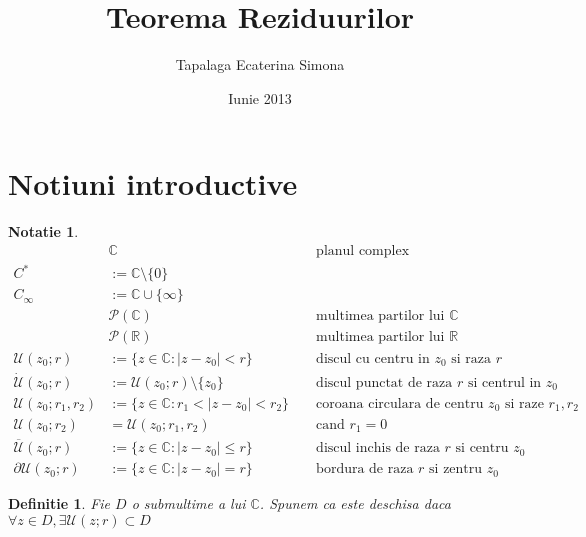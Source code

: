 \documentclass[12pt,a4paper]{article}
\newtheorem{definition}{Definitie}
\newtheorem{notation}{Notatie}
\newcommand{\R}{\ensuremath{\mathbb{R}}}
\newcommand{\C}{\ensuremath{\mathbb{C}}}
\begin{document}
\title{Teorema Reziduurilor}
\author{Tapalaga Ecaterina Simona}
\date{Iunie 2013}
\maketitle


\section{Notiuni introductive}

\begin{notation}
	\begin{align*}
		&\C && \text{ planul complex} \\
		C^* &:= \C \setminus \{0\}   \\
		C_\infty &:= \C\cup \{\infty\} \\
		&\mathcal{P}(\C) && \text{ multimea partilor lui } \C \\
		&\mathcal{P}(\R) && \text{ multimea partilor lui } \R \\
		\mathcal{U}(z_0;r) &:= \{z \in \C \colon |z - z_0| < r \} && \text{ discul cu centru in } z_0 \text{ si raza } r \\
		\dot{\mathcal{U}}(z_0;r) &:= \mathcal{U}(z_0;r) \setminus \{z_0\} && \text{ discul punctat de raza } r \text{ si centrul in } z_0 \\
		\mathcal{U}(z_0;r_1,r_2) &:= \{z \in \C \colon r_1 < |z - z_0| < r_2 \} && \text{ coroana circulara de centru } z_0 \text { si raze } r_1 , r_2 \\
		\mathcal{U}(z_0;r_2) &= \mathcal{U}(z_0;r_1,r_2) && \text{ cand } r_1 = 0\\
		\overline{\mathcal{U}}(z_0;r) &:= \{z \in \C \colon |z - z_0| \leq r \} && \text{ discul inchis de raza } r \text{ si centru } z_0 \\
		\partial\mathcal{U}(z_0;r) &:= \{z \in \C \colon |z - z_0| = r \} && \text{ bordura de raza } r \text{ si zentru } z_0
	\end{align*}
\end{notation}

\begin{definition}
	Fie $D$ o submultime a lui $\C$. Spunem ca este deschisa daca $\forall z \in D, \exists \mathcal{U}(z;r) \subset D$
\end{definition}
\end{document}
